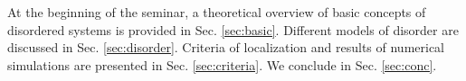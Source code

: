 \documentclass[10pt,a4paper]{article}
\begin{document}
\noindent At the beginning of the seminar, a theoretical overview of basic concepts of disordered systems is provided in Sec. \ref{sec:basic}. Different models of disorder are discussed in Sec. \ref{sec:disorder}. Criteria of localization and results of numerical simulations are presented in Sec. \ref{sec:criteria}. We conclude in Sec. \ref{sec:conc}.


\end{document}
